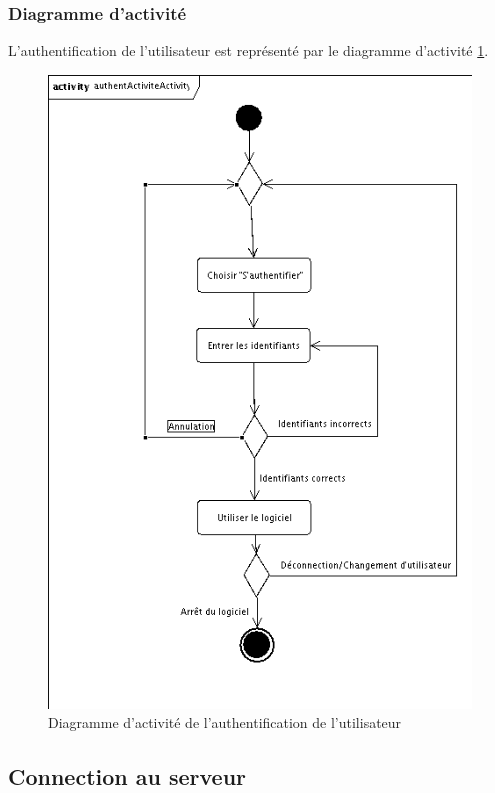 \subsubsection{Diagramme d'activité}
L'authentification de l'utilisateur est représenté par le diagramme d'activité \ref{authentActivite}.
\begin{figure}[!ht]
\begin{center}
\includegraphics[width=12cm]{images/authentActivite.png}
\caption{Diagramme d'activité de l'authentification de l'utilisateur}
\label{authentActivite}
\end{center}
\end{figure}



\subsection{Connection au serveur}

